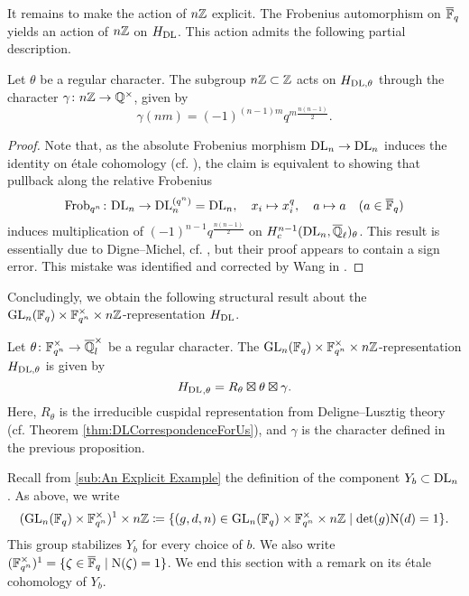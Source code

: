 \documentclass[../main.tex]{subfiles}
\begin{document}
It remains to make the action of $n\mathbb{Z}$ explicit. The Frobenius automorphism on
$\overline {\mathbb{F}}_q$ yields an action of $n\mathbb{Z}$ on $\hH_\DL$. This action admits the
following partial description.

\begin{prop}
  Let $\theta$ be a regular character. The subgroup $n\mathbb{Z} \subset \mathbb{Z}$ acts on
  $H_{\mathrm{DL},\theta}$ through the character $\gamma\colon 
  n\mathbb{Z} \to \mathbb{Q}^\times$, given by
  $$\gamma(nm) =  (-1)^{(n-1)m} q^{m \frac{n(n-1)}2}.$$
  \begin{proof}
    Note that, as the absolute Frobenius morphism $\mathrm{DL}_n \to \mathrm{DL}_n$
    induces the identity on \'etale cohomology (cf.
    \cite[\href{https://stacks.math.columbia.edu/tag/03SN}{Tag
    03SN}]{stacks-project}), the claim is equivalent to showing that pullback 
    along the relative Frobenius 
    \begin{equation*}
      \mathrm{Frob}_{q^n}\colon  \mathrm{DL}_n \to \mathrm{DL}_n^{(q^n)} = \mathrm{DL}_n, \quad
      x_i \mapsto x_i^q,\quad a \mapsto a \quad (a \in \overline {\mathbb{F}}_q)
    \end{equation*}
    induces multiplication of $(-1)^{n-1}q^{\frac{n(n-1)}2}$
    on $H^{n-1}_c(\mathrm{DL}_n, \overline {\mathbb{Q}}_\ell)_\theta$. 
    This result is essentially due to Digne--Michel, cf. \cite[Remarque
    3.14]{digne1985fonctions}, but their proof appears to contain a sign error.
    This mistake was identified and corrected by Wang in \cite[Théorème
    3.1.12]{wang2014espace}.
  \end{proof}
\end{prop}

Concludingly, we obtain the following structural result about the 
$\operatorname{GL}_n(\mathbb{F}_q) \times \mathbb{F}_{q^n}^\times \times n\mathbb{Z}$-representation 
$\hH_\DL$.

\begin{thm}[Structure of $\hH_\DL$]\label{thm:MainThmHDlStructure}
  Let $\theta\colon  \mathbb{F}_{q^n}^\times \to \overline {\mathbb{Q}}_l^\times$ be a regular character.  
  The $\operatorname{GL}_n(\mathbb{F}_q) \times \mathbb{F}_{q^n}^\times \times n\mathbb{Z}$-representation
  $H_{\mathrm{DL}, \theta}$ is given by 
  \begin{equation*}
    {H_\mathrm{DL}}_{,\theta} = R_\theta \boxtimes \theta \boxtimes \gamma.
  \end{equation*}
  Here, $R_\theta$ is the irreducible cuspidal representation from
  Deligne--Lusztig theory (cf. Theorem \ref{thm:DLCorrespondenceForUs}), and
  $\gamma$ is the character defined in the previous proposition.
\end{thm}

Recall from \cref{sub:An Explicit Example} the definition
of the component $Y_b \subset \mathrm{DL}_n$. As above, we write
\begin{equation*}
  (\operatorname{GL}_n(\mathbb{F}_q) \times \mathbb{F}_{q^n}^\times)^1 \times n\mathbb{Z} 
  \coloneq \{(g,d,n) \in \operatorname{GL}_n(\mathbb{F}_q) \times \mathbb{F}_{q^n}^\times \times n\mathbb{Z} 
  \mid \det(g) \mathrm{N}(d) = 1\}.
\end{equation*}
This group stabilizes $Y_b$ for every choice of $b$. 
We also write $(\mathbb{F}_{q^n}^\times)^1 = \{\zeta \in {\overline{\mathbb{F}}_q} \mid \mathrm{N}(\zeta) =
1\}$. We end this section with a remark on its \'etale cohomology of $Y_b$.
\end{document}
